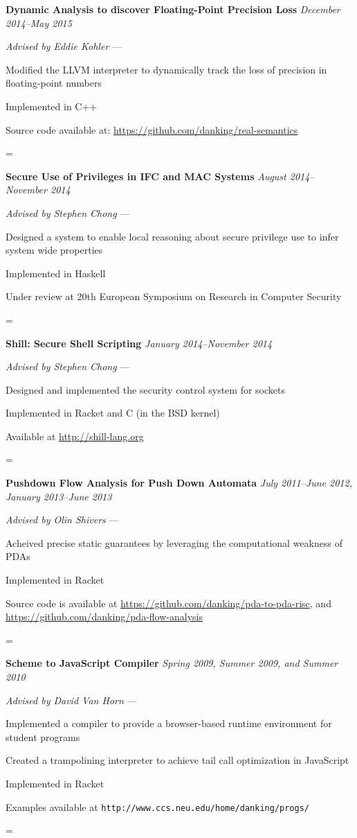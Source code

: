 \documentclass[10pt]{article}
\newenvironment{absolutelynopagebreak}
  {\par\nobreak\vfil\penalty0\vfilneg
   \vtop\bgroup}
  {\par\xdef\tpd{\the\prevdepth}\egroup
   \prevdepth=\tpd}
\newenvironment{my-itemize}
  {\begin{itemize*}
   \renewcommand{\labelitemi}{$\angle$}
  }
  {\end{itemize*}}
\newcommand{\job}[6]{
  \begin{absolutelynopagebreak}
  \vspace{-5pt}
  \begin{tabbing} {\bf #1} \` {\small \textit{#3}} \end{tabbing}
  \vspace{-12pt}
  \begin{my-itemize}
  \setlength\itemsep{1pt}
  \item [] {\textit{#4} \ifthenelse{\equal{#5}{}}
                                   {}
                                   {--- #5}}
  #6
  \end{my-itemize}%
  \end{absolutelynopagebreak}
  \vspace{-18pt}
}
\begin{document}
\job{Dynamic Analysis to discover Floating-Point Precision Loss}
    {}
    {December 2014--May 2015}
    {Advised by Eddie Kohler}
    {}{
  \item{Modified the LLVM interpreter to dynamically track the loss of precision
    in floating-point numbers}
  \item{Implemented in C++}
  \item{Source code available at: \url{https://github.com/danking/real-semantics}}
}

\job{Secure Use of Privileges in IFC and MAC Systems}
    {}
    {August 2014--November 2014}
    {Advised by Stephen Chong}
    {}{
  \item{Designed a system to enable local reasoning about secure privilege use
     to infer system wide properties}
  \item{Implemented in Haskell}
  \item{Under review at 20th European Symposium on Research in Computer Security}
}

\job{Shill: Secure Shell Scripting}
    {}
    {January 2014--November 2014}
    {Advised by Stephen Chong}
    {}{
  \item{Designed and implemented the security control system for sockets}
  \item{Implemented in Racket and C (in the BSD kernel)}
  \item{Available at \url{http://shill-lang.org}}
}

\job{Pushdown Flow Analysis for Push Down Automata}
    {}
    {July 2011--June 2012, January 2013--June 2013}
    {Advised by Olin Shivers}
    {}{
  \item{Acheived precise static guarantees by leveraging the computational
     weakness of PDAs}
  \item{Implemented in Racket}
  \item{Source code is available at
    \url{https://github.com/danking/pda-to-pda-risc}, and \\
    \url{https://github.com/danking/pda-flow-analysis}}
}

\job{Scheme to JavaScript Compiler}
    {}
    {Spring 2009, Summer 2009, and Summer 2010}
    {Advised by David Van Horn}
    {}{
  \item{Implemented a compiler to provide a browser-based runtime environment
     for student programs}
  \item{Created a trampolining interpreter to achieve tail call optimization in
    JavaScript}
  \item{Implemented in Racket}
  \item{Examples available at \texttt{http://www.ccs.neu.edu/home/danking/progs/}}
}
\end{document}
